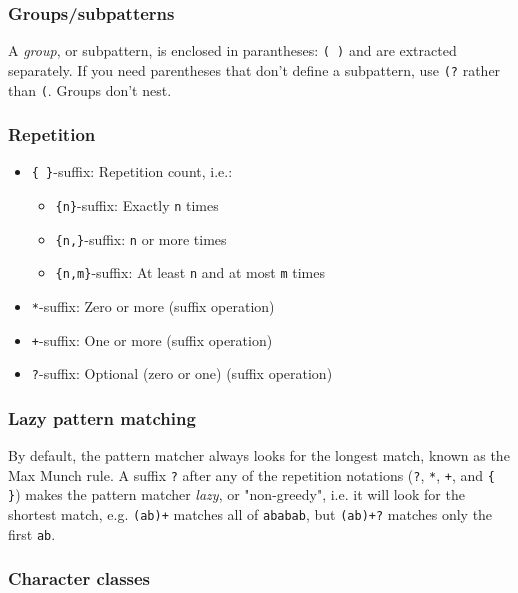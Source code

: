 \documentclass[8pt, table, xcdraw]{article}%
\begin{document}
\subsubsection{Groups/subpatterns} \label{subpatterns}

A \emph{group}, or subpattern, is enclosed in parantheses: \lstinline{( )} and are extracted separately. If you need parentheses that don't define a subpattern, use \lstinline{(?} rather than  \lstinline{(}. Groups don't nest.

\subsubsection{Repetition}

\begin{itemize}
    \item \lstinline|{ }|-suffix: Repetition count, i.e.:
    \begin{itemize}
        \item \lstinline|{n}|-suffix: Exactly \lstinline{n} times
        \item \lstinline|{n,}|-suffix: \lstinline{n} or more times
        \item \lstinline|{n,m}|-suffix: At least \lstinline{n} and at most \lstinline{m} times
    \end{itemize}
    \item \lstinline{*}-suffix: Zero or more (suffix operation)
    \item \lstinline{+}-suffix: One or more (suffix operation)
    \item \lstinline{?}-suffix: Optional (zero or one) (suffix operation)
\end{itemize}

\subsubsection{Lazy pattern matching}

By default, the pattern matcher always looks for the longest match, known as the Max Munch rule. A suffix \lstinline{?} after any of the repetition notations (\lstinline{?}, \lstinline{*}, \lstinline{+}, and \lstinline|{ }|) makes the pattern matcher \emph{lazy}, or "non-greedy", i.e. it will look for the shortest match, e.g. \lstinline{(ab)+} matches all of \lstinline{ababab}, but \lstinline{(ab)+?} matches only the first \lstinline{ab}.

\subsubsection{Character classes}
\end{document}

